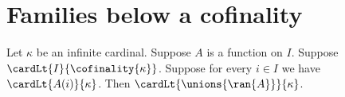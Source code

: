 \section{Families below a cofinality}











\begin{theorem}\label{indexed_union_below_cofinality}
    Let $\kappa$ be an infinite cardinal.
    Suppose $A$ is a function on $I$.
    Suppose $\cardLt{I}{\cofinality{\kappa}}$.
    Suppose for every $i\in I$ we have $\cardLt{A(i)}{\kappa}$.
    Then $\cardLt{\unions{\ran{A}}}{\kappa}$.
\end{theorem}
